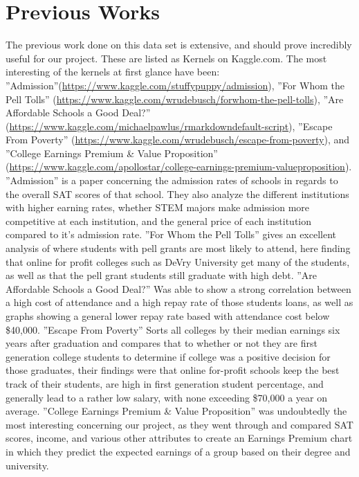 \documentclass[11pt]{article}
\begin{document}
\section*{Previous Works}
\label{sec-1}
The previous work done on this data set is extensive, and should prove incredibly useful for our project. These are listed as Kernels on Kaggle.com. The most interesting of the kernels at first glance have been: ”Admission”(\url{https://www.kaggle.com/stuffypuppy/admission}), ”For Whom the Pell Tolls” (\url{https://www.kaggle.com/wrudebusch/forwhom-the-pell-tolls}), ”Are Affordable Schools a Good Deal?” (\url{https://www.kaggle.com/michaelpawlus/rmarkdowndefault-script}), ”Escape From Poverty” (\url{https://www.kaggle.com/wrudebusch/escape-from-poverty}), and ”College Earnings Premium \& Value Proposition” (\url{https://www.kaggle.com/apollostar/college-earnings-premium-valueproposition}). ”Admission” is a paper concerning the admission rates of schools in regards to the overall SAT scores of that school. They also analyze the different institutions with higher earning rates, whether STEM majors make admission more competitive at each institution, and the general price of each institution compared to it’s admission rate. ”For Whom the Pell Tolls” gives an excellent analysis of where students with pell grants are most likely to attend, here finding that online for profit colleges such as DeVry University get many of the students, as well as that the pell grant students still graduate with high debt. ”Are Affordable Schools a Good Deal?” Was able to show a strong correlation between a high cost of attendance and a high repay rate of those students loans, as well as graphs showing a general lower repay rate based with attendance cost below \$40,000. ”Escape From Poverty” Sorts all colleges by their median earnings six years after graduation and compares that to whether or not they are first generation college students to determine if college was a positive decision for those graduates, their findings were that online for-profit schools keep the best track of their students, are high in first generation student percentage, and generally lead to a rather low salary, with none exceeding \$70,000 a year on average. ”College Earnings Premium \& Value Proposition” was undoubtedly the most interesting concerning our project, as they went through and compared SAT scores, income, and various other attributes to create an Earnings Premium chart in which they predict the expected earnings of a group based on their degree and university.
\end{document}
